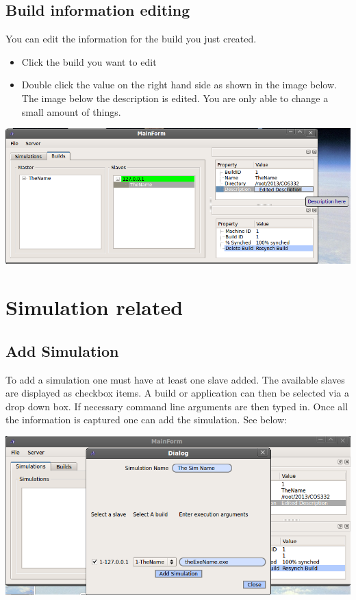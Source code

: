 \documentclass[a4paper,12pt,final]{article}
\begin{document}
 

\subsection{Build information editing}
You can edit the information for the build you just created.
\begin{itemize}
\item Click the build you want to edit
\item Double click the value on the right hand side as shown in the image below. The image below the description is edited. You are only able to change a small amount of things.
\end{itemize}
\begin{center}
  	\includegraphics[scale=0.4]{EditedDescription.png}
 \end{center}


\section{Simulation related}

\subsection{Add Simulation}
To add a simulation one must have at least one slave added. The available slaves are displayed as checkbox items. A build or application can then be selected via a drop down box. If necessary command line arguments are then typed in. Once all the information is captured one can add the simulation. See below:

\begin{center}
  	\includegraphics[scale=0.4]{AddSimFull.png}
 \end{center}
\end{document}
